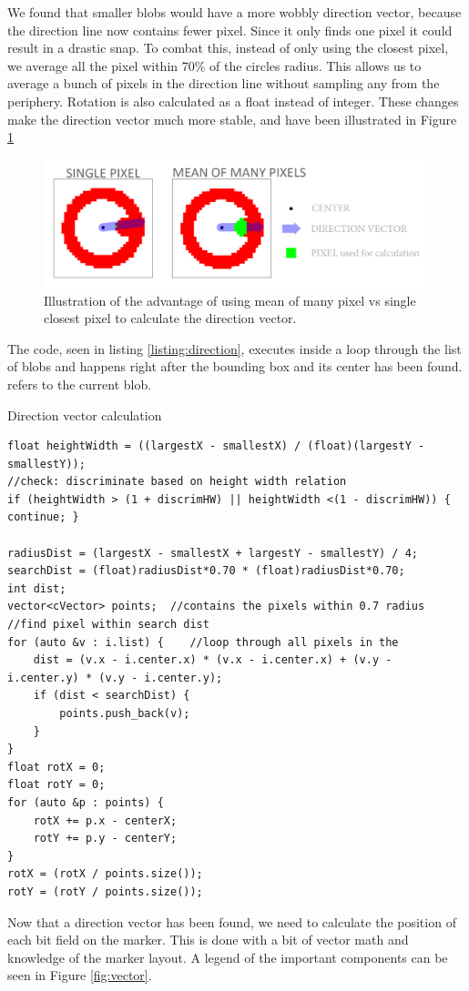 We found that smaller blobs would have a more wobbly direction vector, because the direction line now contains fewer pixel. Since it only finds one pixel it could result in a drastic snap. To combat this, instead of only using the closest pixel, we average all the pixel within 70\% of the circles radius. This allows us to average a bunch of pixels in the direction line without sampling any from the
periphery. Rotation is also calculated as a float instead of integer. These changes make the direction vector much more stable, and have been illustrated in Figure \ref{fig:lowpixel}
\begin{figure}[H]
	\centering
	\includegraphics[width=1\linewidth]{figure/Analysis/lowpixel.png}
	\caption{Illustration of the advantage of using mean of many pixel vs single closest pixel to calculate the direction vector.} 
	\label{fig:lowpixel}
\end{figure}
 The code, seen in listing \ref{listing:direction}, executes inside a loop through the list of blobs and happens right after the bounding box and its center has been found.  refers to the current blob.
\begin{listing}[H]
	\caption{Direction vector calculation}
	\begin{verbatim}
float heightWidth = ((largestX - smallestX) / (float)(largestY - smallestY));
//check: discriminate based on height width relation
if (heightWidth > (1 + discrimHW) || heightWidth <(1 - discrimHW)) { continue; }	

radiusDist = (largestX - smallestX + largestY - smallestY) / 4;
searchDist = (float)radiusDist*0.70 * (float)radiusDist*0.70;
int dist;
vector<cVector> points;  //contains the pixels within 0.7 radius
//find pixel within search dist
for (auto &v : i.list) {	//loop through all pixels in the
	dist = (v.x - i.center.x) * (v.x - i.center.x) + (v.y - i.center.y) * (v.y - i.center.y);
	if (dist < searchDist) {
		points.push_back(v);
	}
}
float rotX = 0;
float rotY = 0;
for (auto &p : points) {
	rotX += p.x - centerX;
	rotY += p.y - centerY;
}
rotX = (rotX / points.size());
rotY = (rotY / points.size());
	\end{verbatim}
	\label{listing:direction}
\end{listing}
Now that a direction vector has been found, we need to calculate the position of each bit field on the marker. This is done with a bit of vector math and knowledge of the marker layout. A legend of the important components can be seen in Figure \ref{fig:vector}.

